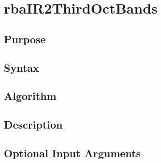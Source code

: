 
\chapter{rbaIR2ThirdOctBands} %
\label{cha:rbaIR2ThirdOctBands} %

\section{Purpose} %
\label{sec:rbaIR2ThirdOctBands_purpose}



\section{Syntax} %
\label{sec:rbaIR2ThirdOctBands_syntax}




\section{Algorithm} %
\label{sec:rbaIR2ThirdOctBands_algorithm}



\section{Description} %
\label{sec:rbaIR2ThirdOctBands_description}



\section{Optional Input Arguments} %
\label{sec:rbaIR2ThirdOctBands_optional_input_arguments}




